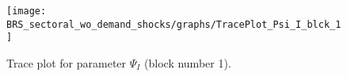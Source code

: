 \begin{figure}[H]
\centering
  \texttt{[image: BRS\_sectoral\_wo\_demand\_shocks/graphs/TracePlot\_Psi\_I\_blck\_1]}\\
    \caption{Trace plot for parameter ${\Psi_I}$ (block number 1).}
\end{figure}

